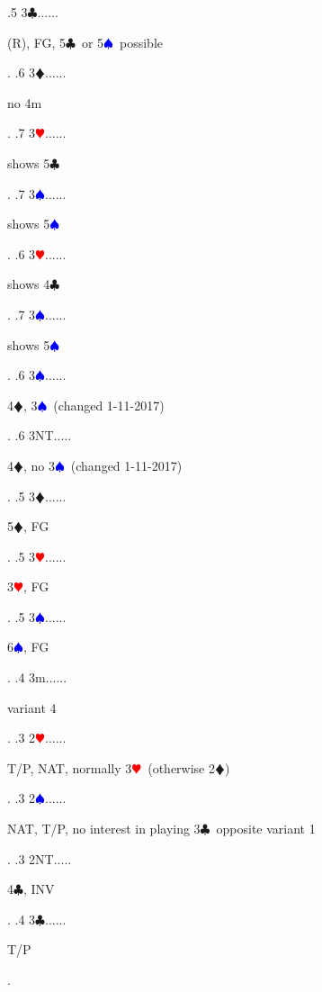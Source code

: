 \documentclass[a4paper]{article}
\newcommand{\BC}{\textcolor{OliveGreen}{$\clubsuit$}}
\newcommand{\BD}{\textcolor{RedOrange}{$\vardiamondsuit$}}
\newcommand{\BH}{\textcolor{Red}{$\varheartsuit${}}}
\newcommand{\BS}{\textcolor{Blue}{$\spadesuit${}}}
\begin{document}
{ .5 3\BC......\begin{minipage}[t]{0.8\textwidth}
(R), FG, 5\BC\ or 5\BS\ possible
\end{minipage}. 
 .6 3\BD......\begin{minipage}[t]{0.8\textwidth}
no 4m
\end{minipage}. 
 .7 3\BH......\begin{minipage}[t]{0.8\textwidth}
shows 5\BC 
\end{minipage}. 
 .7 3\BS......\begin{minipage}[t]{0.8\textwidth}
shows 5\BS 
\end{minipage}. 
 .6 3\BH......\begin{minipage}[t]{0.8\textwidth}
shows 4\BC 
\end{minipage}. 
 .7 3\BS......\begin{minipage}[t]{0.8\textwidth}
shows 5\BS 
\end{minipage}. 
 .6 3\BS......\begin{minipage}[t]{0.8\textwidth}
4\BD , 3\BS\ (changed 1-11-2017)
\end{minipage}. 
 .6 3NT.....\begin{minipage}[t]{0.8\textwidth}
4\BD , no 3\BS\ (changed 1-11-2017)
\end{minipage}. 
 .5 3\BD......\begin{minipage}[t]{0.8\textwidth}
5\BD , FG
\end{minipage}. 
 .5 3\BH......\begin{minipage}[t]{0.8\textwidth}
3\BH , FG
\end{minipage}. 
 .5 3\BS......\begin{minipage}[t]{0.8\textwidth}
6\BS , FG
\end{minipage}. 
 .4 3m......\begin{minipage}[t]{0.8\textwidth}
variant 4
\end{minipage}. 
 .3 2\BH......\begin{minipage}[t]{0.8\textwidth}
T/P, NAT, normally 3\BH\ (otherwise 2\BD )
\end{minipage}. 
 .3 2\BS......\begin{minipage}[t]{0.8\textwidth}
NAT, T/P, no interest in playing 3\BC\ opposite variant 1
\end{minipage}. 
 .3 2NT.....\begin{minipage}[t]{0.8\textwidth}
4\BC , INV
\end{minipage}. 
 .4 3\BC......\begin{minipage}[t]{0.8\textwidth}
T/P
\end{minipage}. 
}
\end{document}

